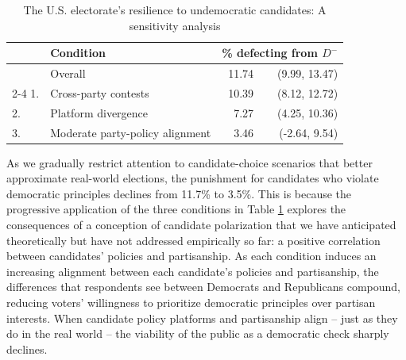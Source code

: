 \documentclass[letterpaper, 12pt]{article}
\begin{document}
\begin{raggedright}
{
\def\sep{0.3em}
\def\ssep{-0.3em}
\def\fns{\footnotesize}
\def\onepc{$^{\ast\ast\ast}$} \def\fivepc{$^{\ast\ast}$}
\def\tenpc{$^{\ast}$}
\def\legend{\multicolumn{3}{l}{\footnotesize{Significance levels
:\hspace{1em} $\dag$ : 10\% \hspace{1em}
$\ast$ : 5\% \hspace{1em} $\ast\ast$ : 1\% \normalsize}}}

\begin{table}[t!]\centering
\caption{The U.S. electorate's resilience to undemocratic candidates: A sensitivity analysis}
\label{tab: conclusion}
\vspace{2mm}

\begin{tabular}{l l r r}

\toprule

& \textbf{Condition} & \multicolumn{2}{c}{\textbf{\% defecting from $D^{-}$}} \\

\midrule

& Overall & 11.74 & (9.99, 13.47) \\
\cmidrule(l){2-4}
1. & Cross-party contests & 10.39 & (8.12, 12.72) \\
2. & Platform divergence & 7.27 & (4.25, 10.36) \\
3. & Moderate party-policy alignment & 3.46 & (-2.64, 9.54) \\
\bottomrule
\end{tabular}

\end{table}
}

As we gradually restrict attention to candidate-choice scenarios that better approximate real-world elections, the punishment for candidates who violate democratic principles declines from 11.7\% to 3.5\%. This is because the progressive application of the three conditions in Table \ref{tab: conclusion} explores the consequences of a conception of candidate polarization that we have anticipated theoretically but have not addressed empirically so far: a positive correlation between candidates' policies and partisanship. As each condition induces an increasing alignment between each candidate's policies and partisanship, the differences that respondents see between Democrats and Republicans compound, reducing voters' willingness to prioritize democratic principles over partisan interests. When candidate policy platforms and partisanship align -- just as they do in the real world -- the viability of the public as a democratic check sharply declines.


\end{raggedright}
\end{document}

